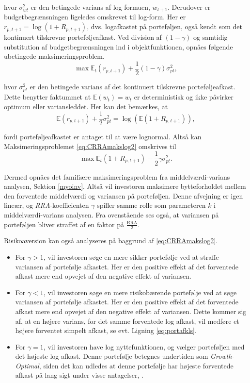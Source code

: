 \documentclass[
  a4paper,
  oneside]{memoir}
\begin{document}
hvor \(\sigma_{wt}^2\) er den betingede varians af log formuen, \(w_{t+1}\). Derudover er budgetbegrænsningen ligeledes omskrevet til log-form. Her er \(r_{p,t+1}=\log(1+R_{p,t+1})\), dvs. logafkastet på porteføljen, også kendt som det kontinuert tilskrevne porteføljeafkast. Ved division af \((1-\gamma)\) og samtidig substitution af budgetbegrænsningen ind i objektfunktionen, opnåes følgende ubetingede maksimeringsproblem.
\begin{equation}
\max\mathbb{E}_t(r_{p,t+1}) + \frac{1}{2}(1-\gamma)\sigma_{pt}^2, \label{eq:CRRAmakslog2}
\end{equation}

hvor \(\sigma_{pt}^2\) er den betingede varians af det kontinuert tilskrevne porteføljeafkast. Dette benytter faktummet at \(\mathbb{E}(w_t)=w_t\) er deterministisk og ikke påvirker optimum eller variansleddet. Her kan det bemærkes, at
\begin{equation}
\mathbb{E}(r_{p,t+1})+\frac{1}{2}\sigma_{pt}^2=\log(\mathbb{E}(1+R_{p,t+1})), \label{eq:portafkls}
\end{equation}

fordi porteføljeafkastet er antaget til at være lognormal. Altså kan Maksimeringsproblemet \eqref{eq:CRRAmakslog2} omskrives til
\begin{equation}
\max\mathbb{E}_t(1+R_{p,t+1}) - \frac{1}{2}\gamma\sigma_{pt}^2. \label{eq:CRRAmakslog3}
\end{equation}

Dermed opnåes det familiære maksimeringsproblem fra middelværdi-varians analysen, Sektion \ref{myoinv}. Altså vil investoren maksimere bytteforholdet mellem den forventede middelværdi og variansen på porteføljen. Denne afvejning er igen lineær, og \emph{RRA}-koefficienten \(\gamma\) spiller samme rolle som parameteren \(k\) i middelværdi-varians analysen. Fra ovenstående ses også, at variansen på porteføljen bliver straffet af en faktor på \(\tfrac{\text{RRA}}{2}\).

Risikoaversion kan også analyseres på baggrund af \eqref{eq:CRRAmakslog2}.

\begin{itemize}
\item
  For \(\gamma>1\), vil investoren søge en mere sikker portefølje ved at straffe variansen af portefølje afkastet. Her er den positive effekt af det forventede afkast mere end opvejet af den negative effekt af variansen.
\item
  For \(\gamma<1\), vil investoren søge en mere risikobærende portefølje ved at søge variansen af portefølje afkastet. Her er den positive effekt af det forventede afkast mere end opvejet af den negative effekt af variansen. Dette kommer sig af, at en højere varians, for det samme forventede log afkast, vil medføre et højere forventet simpelt afkast, se evt. Ligning \eqref{eq:portafkls}.
\item
  For \(\gamma=1\), vil investoren have log nyttefunktionen, og vælger porteføljen med det højeste log afkast. Denne portefølje betegnes undertiden som \emph{Growth-Optimal}, siden det kan udledes at denne portefølje har højeste forventede afkast på lang sigt under visse antagelser, \citep{Kelly1956}.
\end{itemize}
\end{document}
